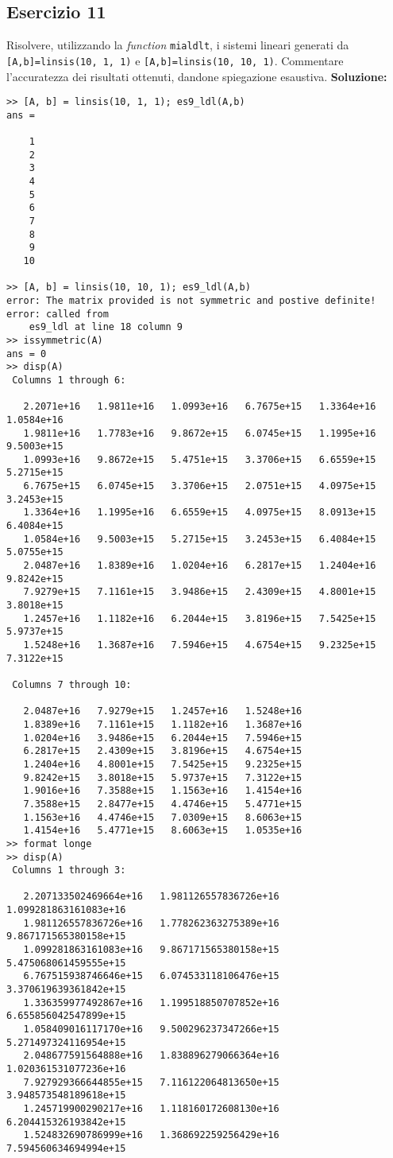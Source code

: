 \subsection{Esercizio 11}
Risolvere, utilizzando la \textit{function} \lstinline{mialdlt}, i sistemi
lineari generati da \lstinline{[A,b]=linsis(10, 1, 1)} e \lstinline{[A,b]=linsis(10, 10, 1)}.
Commentare l'accuratezza dei risultati ottenuti, dandone spiegazione esaustiva.
\newline \textbf{Soluzione:} \newline
\begin{lstlisting}
>> [A, b] = linsis(10, 1, 1); es9_ldl(A,b)
ans =

    1
    2
    3
    4
    5
    6
    7
    8
    9
   10

>> [A, b] = linsis(10, 10, 1); es9_ldl(A,b)
error: The matrix provided is not symmetric and postive definite!
error: called from
    es9_ldl at line 18 column 9
>> issymmetric(A)
ans = 0
>> disp(A)
 Columns 1 through 6:

   2.2071e+16   1.9811e+16   1.0993e+16   6.7675e+15   1.3364e+16   1.0584e+16
   1.9811e+16   1.7783e+16   9.8672e+15   6.0745e+15   1.1995e+16   9.5003e+15
   1.0993e+16   9.8672e+15   5.4751e+15   3.3706e+15   6.6559e+15   5.2715e+15
   6.7675e+15   6.0745e+15   3.3706e+15   2.0751e+15   4.0975e+15   3.2453e+15
   1.3364e+16   1.1995e+16   6.6559e+15   4.0975e+15   8.0913e+15   6.4084e+15
   1.0584e+16   9.5003e+15   5.2715e+15   3.2453e+15   6.4084e+15   5.0755e+15
   2.0487e+16   1.8389e+16   1.0204e+16   6.2817e+15   1.2404e+16   9.8242e+15
   7.9279e+15   7.1161e+15   3.9486e+15   2.4309e+15   4.8001e+15   3.8018e+15
   1.2457e+16   1.1182e+16   6.2044e+15   3.8196e+15   7.5425e+15   5.9737e+15
   1.5248e+16   1.3687e+16   7.5946e+15   4.6754e+15   9.2325e+15   7.3122e+15

 Columns 7 through 10:

   2.0487e+16   7.9279e+15   1.2457e+16   1.5248e+16
   1.8389e+16   7.1161e+15   1.1182e+16   1.3687e+16
   1.0204e+16   3.9486e+15   6.2044e+15   7.5946e+15
   6.2817e+15   2.4309e+15   3.8196e+15   4.6754e+15
   1.2404e+16   4.8001e+15   7.5425e+15   9.2325e+15
   9.8242e+15   3.8018e+15   5.9737e+15   7.3122e+15
   1.9016e+16   7.3588e+15   1.1563e+16   1.4154e+16
   7.3588e+15   2.8477e+15   4.4746e+15   5.4771e+15
   1.1563e+16   4.4746e+15   7.0309e+15   8.6063e+15
   1.4154e+16   5.4771e+15   8.6063e+15   1.0535e+16
>> format longe
>> disp(A)
 Columns 1 through 3:

   2.207133502469664e+16   1.981126557836726e+16   1.099281863161083e+16
   1.981126557836726e+16   1.778262363275389e+16   9.867171565380158e+15
   1.099281863161083e+16   9.867171565380158e+15   5.475068061459555e+15
   6.767515938746646e+15   6.074533118106476e+15   3.370619639361842e+15
   1.336359977492867e+16   1.199518850707852e+16   6.655856042547899e+15
   1.058409016117170e+16   9.500296237347266e+15   5.271497324116954e+15
   2.048677591564888e+16   1.838896279066364e+16   1.020361531077236e+16
   7.927929366644855e+15   7.116122064813650e+15   3.948573548189618e+15
   1.245719900290217e+16   1.118160172608130e+16   6.204415326193842e+15
   1.524832690786999e+16   1.368692259256429e+16   7.594560634694994e+15


\end{lstlisting}
